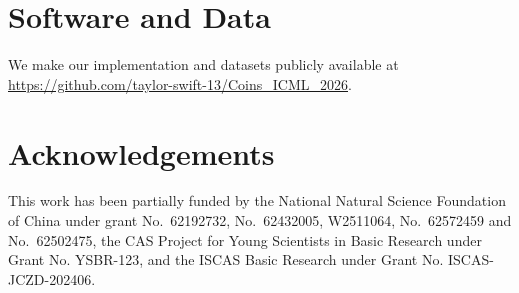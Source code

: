 \documentclass{article}
\theoremstyle{plain}
\theoremstyle{definition}
\theoremstyle{remark}
\begin{document}

































\section*{Software and Data}

We make our implementation and datasets publicly available at \url{https://github.com/taylor-swift-13/Coins_ICML_2026}.


\section*{Acknowledgements}

This work has been partially funded by the National Natural Science Foundation of China under grant No.~62192732, No.~62432005, W2511064, No.~62572459 and No.~62502475, the CAS Project for Young Scientists in Basic Research under Grant No. YSBR-123, and the ISCAS Basic Research under Grant No. ISCAS-JCZD-202406.
\end{document}
